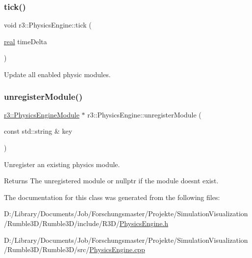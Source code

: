 \subsubsection{\texorpdfstring{tick()}{tick()}}
{\footnotesize\ttfamily void r3\+::\+Physics\+Engine\+::tick (\begin{DoxyParamCaption}\item[{\mbox{\hyperlink{namespacer3_ab2016b3e3f743fb735afce242f0dc1eb}{real}}}]{time\+Delta }\end{DoxyParamCaption})}



Update all enabled physic modules. 

\mbox{\label{classr3_1_1_physics_engine_a54dfdfda1b3f7eb33e9603d247f45aa8}} 
\subsubsection{\texorpdfstring{unregister\+Module()}{unregisterModule()}}
{\footnotesize\ttfamily \mbox{\hyperlink{classr3_1_1_physics_engine_module}{r3\+::\+Physics\+Engine\+Module}} $\ast$ r3\+::\+Physics\+Engine\+::unregister\+Module (\begin{DoxyParamCaption}\item[{const std\+::string \&}]{key }\end{DoxyParamCaption})}



Unregister an existing physics module. 

\begin{DoxyReturn}{Returns}
The unregistered module or nullptr if the module doesn\textquotesingle{}t exist. 
\end{DoxyReturn}


The documentation for this class was generated from the following files\+:\begin{DoxyCompactItemize}
\item 
D\+:/\+Library/\+Documents/\+Job/\+Forschungsmaster/\+Projekte/\+Simulation\+Visualization/\+Rumble3\+D/\+Rumble3\+D/include/\+R3\+D/\mbox{\hyperlink{_physics_engine_8h}{Physics\+Engine.\+h}}\item 
D\+:/\+Library/\+Documents/\+Job/\+Forschungsmaster/\+Projekte/\+Simulation\+Visualization/\+Rumble3\+D/\+Rumble3\+D/src/\mbox{\hyperlink{_physics_engine_8cpp}{Physics\+Engine.\+cpp}}\end{DoxyCompactItemize}
